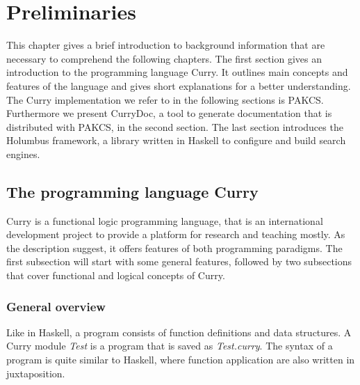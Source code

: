 \documentclass[%
	pdftex,%
	a4paper,%
	oneside,%
	chapterprefix,%
	headsepline,%
	12pt%
]{scrbook}
\begin{document}
\chapter{Preliminaries}\label{preliminaries}
This chapter gives a brief introduction to background information that
are necessary to comprehend the following chapters. %
The first section gives an introduction to the programming language
Curry. %
It outlines main concepts and features of the language and gives short
explanations for a better understanding. %
The Curry implementation we refer to in the following sections is
PAKCS\cite{pakcs}. Furthermore we present CurryDoc\cite{currydoc}, a
tool to generate documentation that is distributed with PAKCS, in the
second section. %
The last section introduces the Holumbus\cite{holumbus} framework, a
library written in Haskell to configure and build search engines. %

\section{The programming language Curry}\label{preliminaries:curry}


Curry is a functional logic programming language, that is an
international development project to provide a platform for research
and teaching mostly. %
As the description suggest, it offers features of both programming
paradigms. %
The first subsection will start with some general features, followed
by two subsections that cover functional and logical concepts of
Curry. %

\subsection{General overview}
Like in Haskell, a program consists of function definitions and data
structures. %
A Curry module \emph{Test} is a program that is saved as
\emph{Test.curry}. %
The syntax of a program is quite similar to Haskell, where function
application are also written in juxtaposition. %
\end{document}
